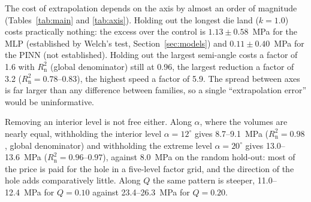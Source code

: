 The cost of extrapolation depends on the axis by almost an order of magnitude (Tables~\ref{tab:main} and \ref{tab:axis}). Holding out the longest die land ($k=1.0$) costs practically nothing: the excess over the control is $1.13\pm0.58$~MPa for the MLP (established by Welch's test, Section~\ref{sec:models}) and $0.11\pm0.40$~MPa for the PINN (not established). %
Holding out the largest semi-angle costs a factor of 1.6 with $R^2_{\mathrm{n}}$ (global denominator) still at 0.96, the largest reduction a factor of 3.2 ($R^2_{\mathrm{n}}=0.78$--$0.83$), the highest speed a factor of 5.9. The spread between axes is far larger than any difference between families, so a single ``extrapolation error'' would be uninformative.

Removing an interior level is not free either. Along $\alpha$, where the volumes are nearly equal, withholding the interior level $\alpha=12^\circ$ gives 8.7--9.1~MPa ($R^2_{\mathrm{n}}=0.98$, global denominator) and withholding the extreme level $\alpha=20^\circ$ gives 13.0--13.6~MPa ($R^2_{\mathrm{n}}=0.96$--$0.97$), against 8.0~MPa on the random hold-out: most of the price is paid for the hole in a five-level factor grid, and the direction of the hole adds comparatively little. Along $Q$ the same pattern is steeper, 11.0--12.4~MPa for $Q=0.10$ against 23.4--26.3~MPa for $Q=0.20$.

